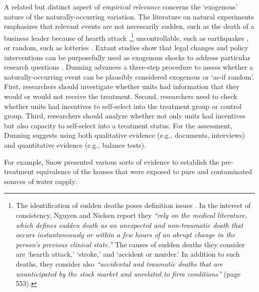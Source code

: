 \begin{refsection}
A related but distinct aspect of \textit{empirical relevance} concerns the
`exogenous' nature of the naturally-occurring variation. The literature on
natural experiments emphasizes that relevant events are not necessarily sudden,
such as the death of a business leader because of hearth attack
\autocite[e.g.,][]{nguyen_et_al_2010},\footnote{The identification of sudden
deaths poses definition issues
\autocite[e.g.,][]{azoulay_et_al_2010,oettl_2012}.  In the interest of
consistency, Nguyen and Nielsen \autocite*{nguyen_et_al_2010} report they
\textit{``rely on the medical literature, which defines sudden death as an
unexpected and non-traumatic death that occurs instantaneously or within a few
hours of an abrupt change in the person’s previous clinical state.''} The causes
of sudden deaths they consider are `hearth attack,' `stroke,' and `accident or
murder.' In addition to such deaths, they consider also \textit{``accidental 
and traumatic deaths that are unanticipated by the stock market and unrelated to
firm conditions''} (page 553). } uncontrollable, such as earthquakes
\autocite[e.g.,][]{belloc_et_al_2016}, or random, such as lotteries
\autocite[e.g.,][]{poulos_2019}.  Extant studies show that legal
changes and policy interventions can be purposefully used as exogenous shocks to
address particular research questions \autocites[e.g.,][]{beaman_et_al_2012,
matsa_miller_2013,chauchard_2014}. Dunning \autocite*[][page 236]{dunning_2012}
advances a three-step procedure to assess whether a naturally-occurring event
can be plausibly considered exogenous or `as-if random'. First, researchers
should investigate whether units had information that they would or would not
receive the treatment. Second, researchers need to check whether units had
incentives to self-select into the treatment group or control group. Third,
researchers should analyze whether not only units had incentives but also
capacity to self-select into a treatment status. For the assessment, Dunning
\autocite*{dunning_2012} suggests using both qualitative evidence (e.g.,
documents, interviews) and quantitative evidence (e.g., balance tests).

For example, Snow \autocite*{snow_1855} presented various sorts of evidence to
establish the pre-treatment equivalence of the houses that were exposed to pure
and contaminated sources of water supply:


\end{refsection}

